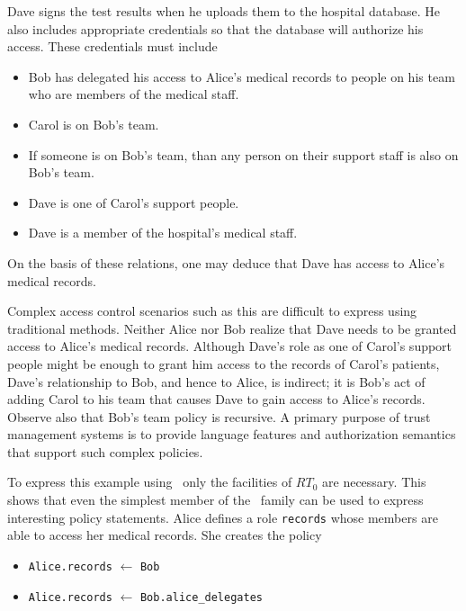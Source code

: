 Dave signs the test results when he uploads them to the hospital database. He also includes
appropriate credentials so that the database will authorize his access. These credentials must
include
\begin{itemize}

\item Bob has delegated his access to Alice's medical records to people on his team who are
  members of the medical staff.

\item Carol is on Bob's team.

\item If someone is on Bob's team, than any person on their support staff is also on Bob's team.

\item Dave is one of Carol's support people.

\item Dave is a member of the hospital's medical staff.

\end{itemize}
On the basis of these relations, one may deduce that Dave has access to Alice's medical records.

Complex access control scenarios such as this are difficult to express using traditional
methods. Neither Alice nor Bob realize that Dave needs to be granted access to Alice's medical
records. Although Dave's role as one of Carol's support people might be enough to grant him
access to the records of Carol's patients, Dave's relationship to Bob, and hence to Alice, is
indirect; it is Bob's act of adding Carol to his team that causes Dave to gain access to Alice's
records. Observe also that Bob's team policy is recursive. A primary purpose of trust management
systems is to provide language features and authorization semantics that support such complex
policies.

To express this example using \RT\, only the facilities of $RT_0$ are necessary. This shows
that even the simplest member of the \RT\ family can be used to express interesting policy
statements. Alice defines a role \texttt{records} whose members are able to access her medical
records. She creates the policy

\begin{itemize}
\item \texttt{Alice.records} $\leftarrow$ \texttt{Bob}
\item \texttt{Alice.records} $\leftarrow$ \texttt{Bob.alice\_delegates}
\end{itemize}

